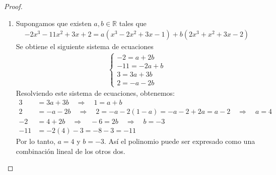 \documentclass[11pt,letterpaper]{article}
\newcommand{\R}{\mathbb{R}}
\begin{document}
\begin{proof}
\begin{enumerate}
        \item Supongamos que existen $a,b\in\R$ tales que
        \begin{align*}
            -2x^3 - 11x^2 + 3x + 2 = a(x^3 - 2x^2 + 3x - 1) + b(2x^3 + x^2 + 3x - 2)
        \end{align*}
        Se obtiene el siguiente sistema de ecuaciones
        \begin{align*}
            \begin{cases}
                -2 = a + 2b \\
                -11 = -2a + b \\
                3 = 3a + 3b \\
                2 = -a - 2b
            \end{cases}
        \end{align*}
        Resolviendo este sistema de ecuaciones, obtenemos:
        \begin{align*}
            3 &= 3a + 3b \quad \Rightarrow \quad 1 = a + b \\
            2 &= -a - 2b \quad \Rightarrow \quad 2 = -a - 2(1 - a) = -a - 2 + 2a = a - 2 \quad \Rightarrow \quad a = 4 \\
            -2 &= 4 + 2b \quad \Rightarrow \quad -6 = 2b \quad \Rightarrow \quad b = -3 \\
            -11 &= -2(4) -3= -8 -3= -11
        \end{align*}
        Por lo tanto, $a = 4$ y $b = -3$. Así el polinomio puede ser expresado como una combinación lineal de los otros dos.
    \end{enumerate}
\end{proof}\,\\
\end{document}
